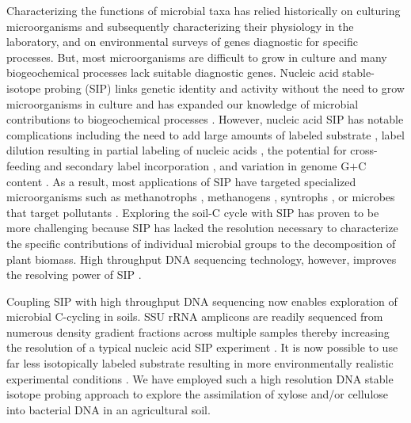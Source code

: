 Characterizing the functions of microbial taxa has relied historically on
culturing microorganisms and subsequently characterizing their physiology in
the laboratory, and on environmental surveys of genes diagnostic for specific
processes. But, most microorganisms are difficult to grow in culture
\citep{Janssen2006} and many biogeochemical processes lack suitable diagnostic
genes. Nucleic acid stable-isotope probing (SIP) links genetic identity and
activity without the need to grow microorganisms in culture and has expanded
our knowledge of microbial contributions to biogeochemical processes
\citep{Chen_Murrell_2010}. However, nucleic acid SIP has notable complications
including the need to add large amounts of labeled substrate
\citep{radajewski2000stable}, label dilution resulting in partial labeling of
nucleic acids \citep{radajewski2000stable,Manefield_2002,McDonald_2005}, the
potential for cross-feeding and secondary label incorporation
\citep{Morris_2002,Hutchens2004,14686943,DeRito2005,McDonald_2005,Ziegler_2005},
and variation in genome G$+$C content
\citep{Buckley_2007,9780408708036,Holben1995,Nusslein1999}. As a result, most
applications of SIP have targeted specialized microorganisms such as
methanotrophs \citep{radajewski2000stable}, methanogens \citep{lu2005},
syntrophs \citep{lueders2004}, or microbes that target pollutants
\citep{derito2005}. Exploring the soil-C cycle with SIP has proven to be more
challenging because SIP has lacked the resolution necessary to characterize the
specific contributions of individual microbial groups to the decomposition of
plant biomass. High throughput DNA sequencing technology, however, improves the
resolving power of SIP \citep{Aoyagi2015}. 

Coupling SIP with high throughput DNA sequencing now enables exploration of
microbial C-cycling in soils. SSU rRNA amplicons are readily sequenced from
numerous density gradient fractions across multiple samples thereby increasing
the resolution of a typical nucleic acid SIP experiment
\citep{Verastegui_2014}. It is now possible to use far less isotopically
labeled substrate resulting in more environmentally realistic experimental
conditions \citep{Aoyagi2015}. We have employed such a high resolution DNA
stable isotope probing approach to explore the assimilation of 
xylose and/or cellulose into bacterial DNA in an agricultural soil. 

